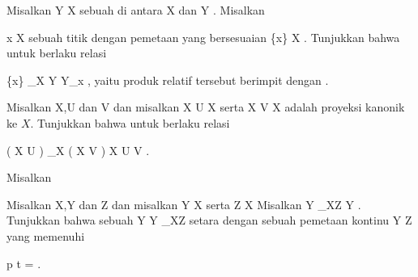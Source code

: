{}
{

Misalkan
 { Y } { X
} {}
sebuah
di antara
\mathkor {} {X} {dan} {Y} {.}
Misalkan

\mavergleichskette
{\vergleichskette
{ x
}
{ \in }{ X
}
{  }{
}
{    }{
}
{   }{
}
}
{}{}{}
sebuah titik dengan pemetaan yang bersesuaian
\maabbdisp {\iota} {\{x\}} { X
} {.}
Tunjukkan bahwa untuk
berlaku relasi

\mavergleichskettedisp
{\vergleichskette
{ \{x\}  \times_X Y
}
{ \cong} { Y_x
}
{ } {
}
{ } {
}
{ } {
}
}
{}{}{,}
yaitu produk relatif tersebut berimpit dengan
.

}
{} {}

{}
{

Misalkan
\mathkor {} {X,U} {dan} {V} {}
dan misalkan
 {X \times U} {X
} {}
serta
 {X \times V} {X
} {}
adalah proyeksi kanonik ke $X$. Tunjukkan bahwa untuk
berlaku relasi

\mavergleichskettedisp
{\vergleichskette
{ \left(  X \times U  \right) \times_X \left(  X \times V  \right)
}
{ \cong} { X \times U \times V
}
{ } {
}
{ } {
}
{ } {
}
}
{}{}{.}

}
{} {}

{}
{

Misalkan
 {\R} {\R
} {}

}
{} {}

{}
{

Misalkan
\mathkor {} {X,Y} {dan} {Z} {}
dan misalkan
\maabb {\varphi} { Y } { X
} {}
serta
 { Z } { X
} {}
Misalkan
 {Y \times_XZ } { Y
} {.}
Tunjukkan bahwa sebuah
 { Y } { Y \times_XZ
} {}
setara dengan sebuah pemetaan kontinu
 { Y } { Z
} {}
yang memenuhi

\mavergleichskette
{\vergleichskette
{ p \circ t
}
{ = }{ \varphi
}
{  }{
}
{    }{
}
{   }{
}
}
{}{}{.}

}
{} {}

